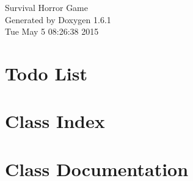 \documentclass[a4paper]{book}
\begin{document}
\hypersetup{pageanchor=false}
\begin{titlepage}
\vspace*{7cm}
\begin{center}
{\Large Survival Horror Game }\\
\vspace*{1cm}
{\large Generated by Doxygen 1.6.1}\\
\vspace*{0.5cm}
{\small Tue May 5 08:26:38 2015}\\
\end{center}
\end{titlepage}
\clearemptydoublepage
{}
\tableofcontents
\clearemptydoublepage
{}
\hypersetup{pageanchor=true}
\chapter{Todo List}
\label{todo}
\hypertarget{todo}{}

\chapter{Class Index}

\chapter{Class Documentation}



















\printindex
\end{document}

